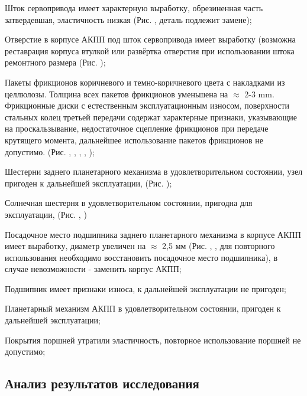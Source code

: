 Шток сервопривода имеет характерную выработку, обрезиненная часть затвердевшая, эластичность низкая (Рис. , деталь подлежит замене);

Отверстие в корпусе АКПП под шток сервопривода имеет выработку (возможна реставрация корпуса втулкой или развёртка  отверстия при использовании  штока  ремонтного размера (Рис. );

Пакеты фрикционов коричневого и темно-коричневого цвета с накладками из целлюлозы. Толщина всех пакетов фрикционов уменьшена на $ \approx $ 2-3 mm.  Фрикционные диски  с естественным эксплуатационным износом, поверхности стальных колец  третьей передачи   содержат характерные признаки, указывающие на проскальзывание, недостаточное сцепление фрикционов при передаче крутящего момента, дальнейшее использование пакетов фрикционов не допустимо. (Рис. , , , , );

Шестерни заднего планетарного механизма в удовлетворительном состоянии, узел пригоден к дальнейшей эксплуатации, (Рис. ); 

Солнечная шестерня в удовлетворительном состоянии, пригодна для эксплуатации, (Рис. ,  )

Посадочное место подшипника заднего планетарного механизма в корпусе АКПП имеет  выработку, диаметр увеличен на $ \approx $  2,5 мм (Рис. , , для повторного использования необходимо восстановить посадочное место подшипника), в случае невозможности - заменить корпус АКПП;

Подшипник имеет признаки износа, к дальнейшей эксплуатации не пригоден;

Планетарный механизм АКПП в удовлетворительном состоянии, пригоден к дальнейшей эксплуатации;

Покрытия поршней утратили эластичность, повторное использование поршней не допустимо;



 
\subsection{Анализ результатов исследования}

